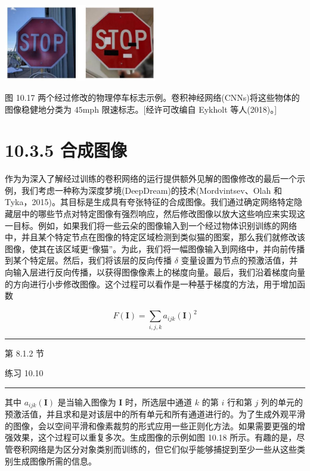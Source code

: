 \documentclass[10pt]{article}
\newcommand{\HRule}{\begin{center}\rule{0.9\linewidth}{0.2mm}\end{center}}
\begin{document}
\begin{center}
\includegraphics[max width=0.5\textwidth]{images/0194e279-9b28-703a-88f4-c3ac21e2010d_326_868_1593_655_331_0.jpg}
\end{center}
\hspace*{3em} 

图 10.17 两个经过修改的物理停车标志示例。卷积神经网络(CNNs)将这些物体的图像稳健地分类为 \({45}\mathrm{{mph}}\) 限速标志。[经许可改编自 Eykholt 等人(2018)。]

\section*{10.3.5 合成图像}

作为为深入了解经过训练的卷积网络的运行提供额外见解的图像修改的最后一个示例，我们考虑一种称为深度梦境(DeepDream)的技术(Mordvintsev、Olah 和 Tyka，2015)。其目标是生成具有夸张特征的合成图像。我们通过确定网络特定隐藏层中的哪些节点对特定图像有强烈响应，然后修改图像以放大这些响应来实现这一目标。例如，如果我们将一些云朵的图像输入到一个经过物体识别训练的网络中，并且某个特定节点在图像的特定区域检测到类似猫的图案，那么我们就修改该图像，使其在该区域更“像猫”。为此，我们将一幅图像输入到网络中，并向前传播到某个特定层。然后，我们将该层的反向传播 \(\delta\) 变量设置为节点的预激活值，并向输入层进行反向传播，以获得图像像素上的梯度向量。最后，我们沿着梯度向量的方向进行小步修改图像。这个过程可以看作是一种基于梯度的方法，用于增加函数

\[
F\left( \mathbf{I}\right)  = \mathop{\sum }\limits_{{i,j,k}}{a}_{ijk}{\left( \mathbf{I}\right) }^{2} \tag{10.12}
\]

\HRule

第 8.1.2 节

练习 10.10

\HRule

其中 \({a}_{ijk}\left( \mathbf{I}\right)\) 是当输入图像为 \(\mathbf{I}\) 时，所选层中通道 \(k\) 的第 \(i\) 行和第 \(j\) 列的单元的预激活值，并且求和是对该层中的所有单元和所有通道进行的。为了生成外观平滑的图像，会以空间平滑和像素裁剪的形式应用一些正则化方法。如果需要更强的增强效果，这个过程可以重复多次。生成图像的示例如图 10.18 所示。有趣的是，尽管卷积网络是为区分对象类别而训练的，但它们似乎能够捕捉到至少一些从这些类别生成图像所需的信息。
\end{document}
